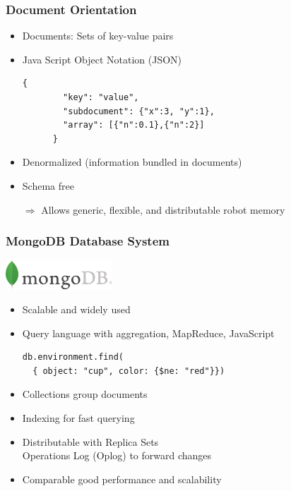 \begin{frame}[fragile]
  \frametitle{Document Orientation}
  \begin{itemize}
  \item Documents: Sets of key-value pairs
  \item Java Script Object Notation (JSON)
    \begin{lstlisting}[style=SmallJSON,linewidth=8.5cm,
      label=lst:json,
      framexleftmargin=1pt, xleftmargin=0pt,
      morekeywords={}, numbers=none]
      {
        "key": "value",
        "subdocument": {"x":3, "y":1},
        "array": [{"n":0.1},{"n":2}]
      }
    \end{lstlisting}
  \item Denormalized (information bundled in documents)
  \item Schema free
  \end{itemize}
  \begin{itemize}
  \item[$\Rightarrow$] Allows generic, flexible, and distributable robot memory
  \end{itemize}
\end{frame}

\begin{frame}[fragile]
  \frametitle{MongoDB Database System}
  \hfill\includegraphics[width=0.3\textwidth]{../thesis/img/mongodb}
  \begin{itemize}
    \item Scalable and widely used
    \item Query language with aggregation, MapReduce, JavaScript %
\begin{lstlisting}[style=SmallJSON,linewidth=8.5cm,
  framexleftmargin=2pt, xleftmargin=10pt,
 morekeywords={}, numbers=none]
db.environment.find(
  { object: "cup", color: {$ne: "red"}})
\end{lstlisting}%
    \item Collections group documents
    \item Indexing for fast querying
    \item Distributable with Replica Sets\\ %
      Operations Log (Oplog) to forward changes
    \item Comparable good performance and scalability\\\cite{arango-vs-mongo,db-comparison}
  \end{itemize}
\end{frame}

